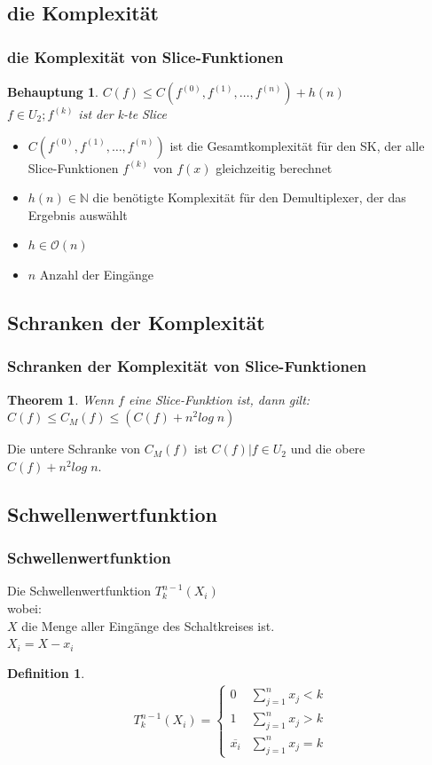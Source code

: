 \documentclass[hyperref={pdfpagelabels=false}]{beamer} %
\newtheorem{thm}{Theorem}
\newtheorem{defin}{Definition}
\newtheorem{beh}{Behauptung}
\begin{document}
  \subsection{die Komplexität}
  \begin{frame}%
    \frametitle{die Komplexität von Slice-Funktionen}
    \begin{beh}
      $C(f) \leq C(f^{(0)}, f^{(1)}, \dots ,f^{(n)})+h(n)$\\
      $f \in U_2; f^{(k)}$ ist der k-te Slice
    \end{beh}
    \begin{itemize}
      \item $C(f^{(0)}, f^{(1)}, \dots ,f^{(n)})$ ist die Gesamtkomplexität für den SK, der alle Slice-Funktionen $f^{(k)}$ von $f(x)$ gleichzeitig berechnet
      \item $h(n) \in \mathbb{N}$ die benötigte Komplexität für den Demultiplexer, der das Ergebnis ausw\"ahlt
      \item $h \in \mathcal{O}(n)$
      \item $n$ Anzahl der Eingänge
    \end{itemize}
  \end{frame}

  \subsection*{Schranken der Komplexität}
  \begin{frame}%
    \frametitle{Schranken der Komplexität von Slice-Funktionen}
    \begin{thm}
      Wenn $f$ eine Slice-Funktion ist, dann gilt:
      $C(f) \leq C_M(f) \leq (C(f) + n^2 log\;n)$%
    \end{thm}
    Die untere Schranke von $C_M(f)$ ist $C(f)|f \in U_2$ und die obere $C(f) + n^2 log\; n$.
  \end{frame}

  \subsection*{Schwellenwertfunktion}
  \begin{frame}%
     \frametitle{Schwellenwertfunktion}
     Die Schwellenwertfunktion $ T^{n-1}_k(X_i)$\\
     wobei: \\
     $X$ die Menge aller Eingänge des Schaltkreises ist.\\
     $X_i = X - x_i$ %
     \begin{defin}
       \begin{align*}
       T^{n-1}_k (X_i)=
       \begin{cases}
         0 & \sum\nolimits_{j=1}^{n} x_j < k\\
         1 & \sum\nolimits_{j=1}^{n} x_j > k\\
         \overline{x_i} & \sum\nolimits_{j=1}^{n} x_j = k
        \end{cases}
       \end{align*}
      \end{defin}
  \end{frame}
\end{document}
